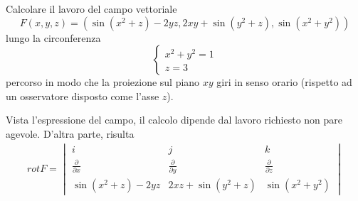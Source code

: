 \clearpage
\begin{esercizio}
	Calcolare il lavoro del campo vettoriale
	\begin{equation*}
		F(x,y,z)=(\sin(x^2+z)- 2yz, 2xy+\sin(y^2+z),\sin(x^2+y^2))
	\end{equation*}
	lungo la circonferenza
	\begin{equation*}
		\begin{cases}
			x^2+y^2=1\\
			z=3
		\end{cases}
	\end{equation*}
	percorso in modo che la proiezione sul piano $xy$ giri in senso orario (rispetto ad un osservatore disposto come l'asse $z$).\\
\end{esercizio}
\begin{svol}
	Vista l'espressione del campo, il calcolo dipende dal lavoro richiesto non pare agevole. D'altra parte, risulta
	\begin{equation*}
		\begin{matrix}
			rot F= \begin{vmatrix}
				i & j & k\\
				\frac{\partial}{\partial x} & \frac{\partial}{\partial y} &  \frac{\partial}{\partial z}\\
				\sin(x^2+z)-2yz & 2xz+\sin(y^2+z) & \sin (x^2+y^2)
			\end{vmatrix}
		\end{matrix}
	\end{equation*}
	
\end{svol}

